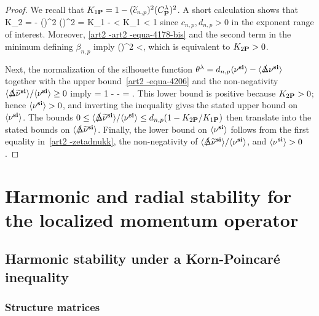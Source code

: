 \documentclass[11pt]{article}
\numberwithin{table}{section}
\numberwithin{equation}{section}
\numberwithin{table}{section}
\numberwithin{figure}{section}
\begin{document}
\begin{proof}
We recall that $K_{1\textnormal{\textbf{P}}} = 1 - (\widetilde{c}_{n,p})^2 (C_{\textnormal{\textbf{P}}}^{\lambda})^2$.
A short calculation shows that
\bse
\be
K_{2\Poin} =  - (\tcnp)^2 (\CPoin)^2
= K_{1\Poin} - 
< K_{1\Poin} < 1
\ee
since $c_{n,p},d_{n,p}>0$ in the exponent range of interest. Moreover, \eqref{art2 -art2 -equa-4178-bis} and the second term in the minimum defining $\beta_{n,p}$ imply
\be
(\CPoin)^2
<,
\ee
which is equivalent to $K_{2\textnormal{\textbf{P}}}>0$.

Next, the normalization of the silhouette function $\theta^\lambda = d_{n,p}\langle\nu^{\textnormal{\textbf{si}}}\rangle - \langle\slashed\Delta{}\nu^{\textnormal{\textbf{si}}}\rangle$ together with
the upper bound~\eqref{art2 -equa-4206} and { the non-negativity $\langle\slashed\Delta{}\widetilde\nu^{\textnormal{\textbf{si}}}\rangle/\langle\nu^{\textnormal{\textbf{si}}}\rangle\geq0$ imply}
= 1 - 
 -  =  .
\ee
\ese
This lower bound is positive because $K_{2\textnormal{\textbf{P}}}>0$; hence $\langle\nu^{\textnormal{\textbf{si}}}\rangle>0$, and inverting the inequality gives the stated upper bound on~$\langle\nu^{\textnormal{\textbf{si}}}\rangle$. The bounds $0\leq\langle\slashed\Delta{}\widetilde\nu^{\textnormal{\textbf{si}}}\rangle/\langle\nu^{\textnormal{\textbf{si}}}\rangle\leq d_{n,p}(1-K_{2\textnormal{\textbf{P}}}/K_{1\textnormal{\textbf{P}}})$ then translate into the stated bounds on $\langle\slashed\Delta{}\widetilde\nu^{\textnormal{\textbf{si}}}\rangle$. Finally, the lower bound on $\langle\nu^{\textnormal{\textbf{si}}}\rangle$ follows from the first equality in~\eqref{art2 -zetadnukk}, the non-negativity of $\langle\slashed\Delta{}\widetilde\nu^{\textnormal{\textbf{si}}}\rangle/\langle\nu^{\textnormal{\textbf{si}}}\rangle$, and $\langle\nu^{\textnormal{\textbf{si}}}\rangle>0$. 
\end{proof}


\section{Harmonic and radial stability for the localized momentum operator}
\label{section-4} 
 
\subsection{Harmonic stability under a Korn-Poincaré inequality}
\label{art2 -section=3.1}

\subsubsection{Structure matrices}
\end{document}
